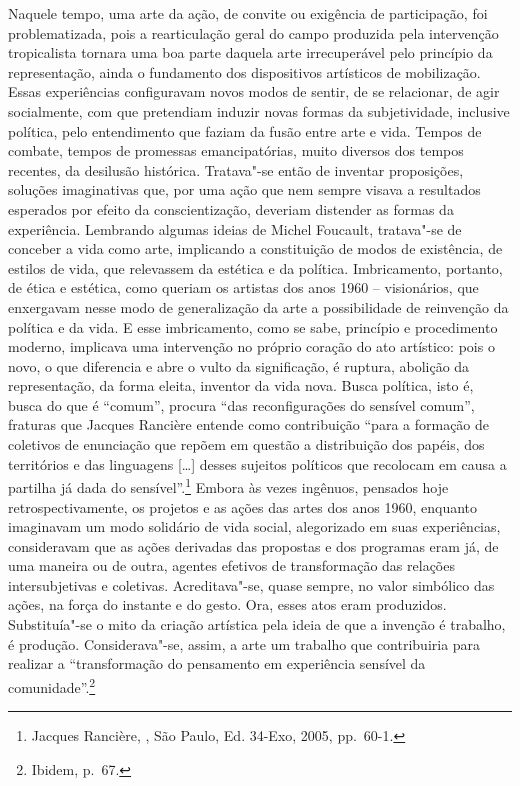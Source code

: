 Naquele tempo, uma arte da ação, de convite ou exigência de
participação, foi problematizada, pois a rearticulação geral do campo
produzida pela intervenção tropicalista tornara uma boa parte daquela
arte irrecuperável pelo princípio da representação, ainda o fundamento
dos dispositivos artísticos de mobilização. Essas experiências
configuravam novos modos de sentir, de se relacionar, de agir
socialmente, com que pretendiam induzir novas formas da subjetividade,
inclusive política, pelo entendimento que faziam da fusão entre arte e
vida. Tempos de combate, tempos de promessas emancipatórias, muito
diversos dos tempos recentes, da desilusão histórica. Tratava"-se então
de inventar proposições, soluções imaginativas que, por uma ação que nem
sempre visava a resultados esperados por efeito da conscientização,
deveriam distender as formas da experiência. Lembrando algumas ideias de
Michel Foucault, tratava"-se de conceber a vida como arte, implicando a
constituição de modos de existência, de estilos de vida, que relevassem
da estética e da política. Imbricamento, portanto, de ética e estética,
como queriam os artistas dos anos 1960 -- visionários, que enxergavam
nesse modo de generalização da arte a possibilidade de reinvenção da
política e da vida. E esse imbricamento, como se sabe, princípio e
procedimento moderno, implicava uma intervenção no próprio coração do
ato artístico: pois o novo, o que diferencia e abre o vulto da
significação, é ruptura, abolição da representação, da forma eleita,
inventor da vida nova. Busca política, isto é, busca do que é ``comum'',
procura ``das reconfigurações do sensível comum'', fraturas que Jacques
Rancière entende como contribuição ``para a formação de coletivos de
enunciação que repõem em questão a distribuição dos papéis, dos
territórios e das linguagens {[}\ldots{}{]} desses sujeitos políticos que
recolocam em causa a partilha já dada do sensível''.\footnote{Jacques
Rancière, {}, São Paulo, Ed. 34-Exo, 2005, pp.~60-1.} Embora às vezes
ingênuos, pensados hoje retrospectivamente,
os projetos e as ações das artes dos anos 1960, enquanto imaginavam um
modo solidário de vida social, alegorizado em suas experiências,
consideravam que as ações derivadas das propostas e dos programas eram
já, de uma maneira ou de outra, agentes efetivos de transformação das
relações intersubjetivas e coletivas. Acreditava"-se, quase sempre, no
valor simbólico das ações, na força do instante e do gesto. Ora, esses
atos eram produzidos. Substituía"-se o mito da criação artística pela
ideia de que a invenção é trabalho, é produção. Considerava"-se, assim, a
arte um trabalho que contribuiria para realizar a ``transformação do
pensamento em experiência sensível da comunidade''.\footnote{Ibidem, p.~67.}

